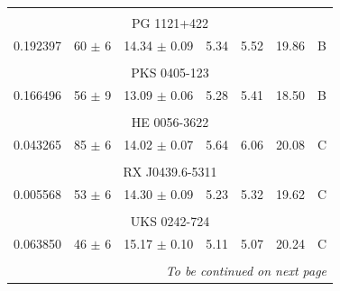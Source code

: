 \begin{table}[!h]
\begin{tabular}{ccccccc}
            \hline \tabularnewline

            \multicolumn{7}{c}{PG 1121+422} \\ \hline 

            0.192397  &  60 $\pm$ 6  &  14.34 $\pm$ 0.09  &  5.34  &  5.52  &  19.86  &  B \\

            \hline \tabularnewline

            \multicolumn{7}{c}{PKS 0405-123} \\ \hline 

            0.166496  &  56 $\pm$ 9  &  13.09 $\pm$ 0.06  &  5.28  &  5.41  &  18.50  &  B \\

            \hline \tabularnewline

            \multicolumn{7}{c}{HE 0056-3622} \\ \hline 

            0.043265  &  85 $\pm$ 6  &  14.02 $\pm$ 0.07  &  5.64  &  6.06  &  20.08  &  C \\

            \hline \tabularnewline

            \multicolumn{7}{c}{RX J0439.6-5311} \\ \hline 

            0.005568  &  53 $\pm$ 6  &  14.30 $\pm$ 0.09  &  5.23  &  5.32  &  19.62  &  C \\

            \hline \tabularnewline

            \multicolumn{7}{c}{UKS 0242-724} \\ \hline 

            0.063850  &  46 $\pm$ 6  &  15.17 $\pm$ 0.10  &  5.11  &  5.07  &  20.24  &  C \\

            \hline \tabularnewline

            \hline \hline
            \multicolumn{7}{r}{\footnotesize{\emph{To be continued on next page}}}
        \end{tabular}
    

\end{table}




